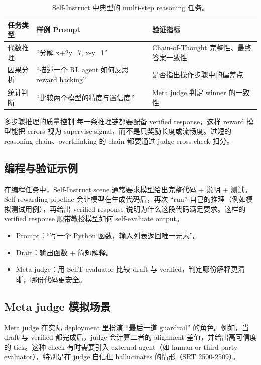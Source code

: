 \documentclass[a4paper]{article}
\begin{document}
\begin{table}[H]
\centering
\begin{tabular}{p{4cm}p{4cm}p{6cm}}
\toprule
任务类型 & 样例 Prompt & 验证指标 \\
\midrule
代数推理 & ``分解 x+2y=7, x-y=1'' & Chain-of-Thought 完整性、最终答案一致性 \\
因果分析 & ``描述一个 RL agent 如何反思 reward hacking'' & 是否指出操作步骤中的偏差点 \\
统计判断 & ``比较两个模型的精度与置信度'' & Meta judge 判定 winner 的一致性 \\
\bottomrule
\end{tabular}
\caption{Self-Instruct 中典型的 multi-step reasoning 任务。}
\end{table}

\begin{knowledgebox}{多步骤推理的质量控制}
每一条推理链都要配备 verified response，这样 reward 模型能把 errors 视为 supervise signal，而不是只奖励长度或流畅度。过短的 reasoning chain、overthinking 的 chain 都要通过 judge cross-check 扣分。
\end{knowledgebox}

\subsection{编程与验证示例}
在编程任务中，Self-Instruct scene 通常要求模型给出完整代码 + 说明 + 测试。Self-rewarding pipeline 会让模型在生成代码后，再次 ``run'' 自己的推理（例如模拟测试用例），再给出 verified response 说明为什么这段代码满足要求。这样的 verified response 顺带教授模型如何 self-evaluate output。

\begin{itemize}
    \item Prompt：``写一个 Python 函数，输入列表返回唯一元素''。
    \item Draft：输出函数 + 简短解释。
    \item Meta judge：用 SelfT evaluator 比较 draft 与 verified，判定哪份解释更清晰，哪份代码更安全。
\end{itemize}

\subsection{Meta judge 模拟场景}
Meta judge 在实际 deployment 里扮演 ``最后一道 guardrail'' 的角色。例如，当 draft 与 verified 都完成后，judge 会计算二者的 alignment 差值，并给出高可信度的 tick。这种 check 有时需要引入 external agent（如 human or third-party evaluator），特别是在 judge 自信但 hallucinates 的情形（SRT 2500-2509）。
\end{document}
